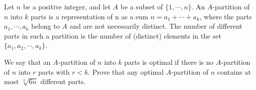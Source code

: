 Let 
$n$
 be a positive integer, and let 
$A$
 be a subset of 
$\{ 1,\cdots ,n\}$.
 An 
$A$-partition of 
$n$
 into 
$k$
 parts is a representation of n as a sum 
$n = a_1 + \cdots + a_k$, 
 where the parts 
$a_1 , \cdots , a_k $
 belong to 
$A$
 and are not necessarily distinct. The number of different parts in such a partition is the number of (distinct) elements in the set 
$\{ a_1 , a_2 , \cdots , a_k \} $.


We say that an 
$A$-partition of 
$n$
 into 
$k$
 parts is optimal if there is no 
$A$-partition of 
$n$
 into 
$r$
 parts with 
$r<k$.
 Prove that any optimal 
$A$-partition of 
$n$
 contains at most 
$\sqrt[3]{6n}$
 different parts.
